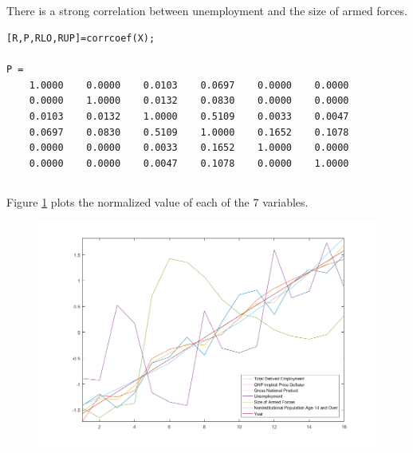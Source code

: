 \documentclass[12pt]{article}
\begin{document}
\subsection{} %
There is a strong correlation between unemployment and the size of armed forces.

\begin{minipage}{\linewidth}
\begin{lstlisting}
[R,P,RLO,RUP]=corrcoef(X);

P =
    1.0000    0.0000    0.0103    0.0697    0.0000    0.0000
    0.0000    1.0000    0.0132    0.0830    0.0000    0.0000
    0.0103    0.0132    1.0000    0.5109    0.0033    0.0047
    0.0697    0.0830    0.5109    1.0000    0.1652    0.1078
    0.0000    0.0000    0.0033    0.1652    1.0000    0.0000
    0.0000    0.0000    0.0047    0.1078    0.0000    1.0000
\end{lstlisting}
\end{minipage}

\subsection{} %

Figure \ref{fig_4e} plots the normalized value of each of the 7 variables.

\begin{figure}
    \includegraphics[width=\linewidth]{plot_4e}
    \centering
    \caption{}
    \label{fig_4e}
\end{figure}
\end{document}
